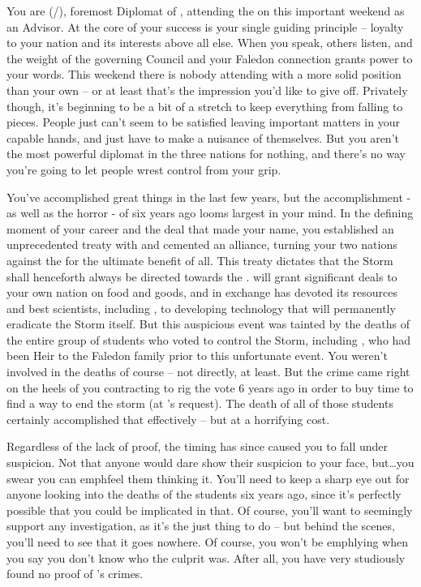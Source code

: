 \documentclass[char]{GL2020}
\begin{document}
\name{\cDiplomat{}}

You are \cDiplomat{} (\cDiplomat{\they}/\cDiplomat{\them}), foremost Diplomat of \pTech{}, attending the \pSchool{} on this important weekend as an Advisor.  At the core of your success is your single guiding principle -- loyalty to your nation and its interests above all else. When you speak, others listen, and the weight of the governing Council and your Faledon connection grants power to your words. This weekend there is nobody attending with a more solid position than your own -- or at least that’s the impression you’d like to give off. Privately though, it’s beginning to be a bit of a stretch to keep everything from falling to pieces. People just can’t seem to be satisfied leaving important matters in your capable hands, and just have to make a nuisance of themselves. But you aren’t the most powerful diplomat in the three nations for nothing, and there’s no way you’re going to let people wrest control from your grip.

You’ve accomplished great things in the last few years, but the accomplishment - as well as the horror - of six years ago looms largest in your mind.  In the defining moment of your career and the deal that made your name, you established an unprecedented treaty with \pFarm{} and cemented an alliance, turning your two nations against the \pShip{} for the ultimate benefit of all.  This treaty dictates that the Storm shall henceforth always be directed towards the \pShip{}.  \pFarm{} will grant significant deals to your own nation on food and goods, and in exchange \pTech{} has devoted its resources and best scientists, including \cHeadScientist{}, to developing technology that will permanently eradicate the Storm itself.  But this auspicious event was tainted by the deaths of the entire group of students who voted to control the Storm, including \cHeirSibling{}, who had been Heir to the Faledon family prior to this unfortunate event. You weren’t involved in the deaths of course -- not directly, at least. But the crime came right on the heels of you contracting \cEvil{} to rig the vote 6 years ago in order to buy \cHeadScientist{} time to find a way to end the storm (at \cHeadScientist{}’s request). The death of all of those students certainly accomplished that effectively -- but at a horrifying cost.

Regardless of the lack of proof, the timing has since caused you to fall under suspicion. Not that anyone would dare show their suspicion to your face, but\ldots you swear you can emph{feel} them thinking it. You’ll need to keep a sharp eye out for anyone looking into the deaths of the students six years ago, since it’s perfectly possible that you could be implicated in that. Of course, you’ll want to seemingly support any investigation, as it’s the just thing to do -- but behind the scenes, you’ll need to see that it goes nowhere. Of course, you won’t be emph{lying} when you say you don’t know who the culprit was. After all, you have very studiously found no proof of \cEvil{}’s crimes.
\end{document}
